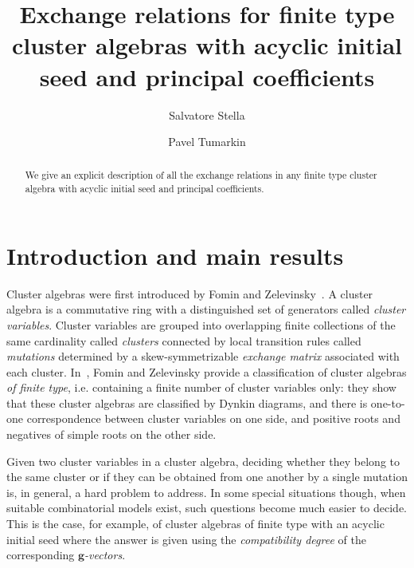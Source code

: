 \documentclass[11pt]{amsart}
\newcommand{\bg}{\mathbf{g}}
\theoremstyle{definition}
\numberwithin{equation}{section}
\numberwithin{figure}{section}
\begin{document}
\title[Exchange relations for finite type]{Exchange relations for finite type cluster algebras with acyclic initial seed and principal coefficients}

\author[Stella]{Salvatore Stella}
\address[Salvatore Stella]{IN$d$AM - Marie Curie Actions fellow, Universit\`a ``La Sapienza'', Roma, Italy.}

\author[tumarkin]{Pavel Tumarkin}
\address[Pavel Tumarkin]{Department of Mathematical Sciences, Durham University, UK}

\begin{abstract}
We give an explicit description of all the exchange relations in any finite type cluster algebra with acyclic initial seed and principal coefficients.
\end{abstract}

\maketitle

\section{Introduction and main results}
\say[PT]{}
Cluster algebras were first introduced by Fomin and Zelevinsky~\cite{FZ02}. A cluster algebra is a commutative ring with a distinguished set of generators called {\em cluster variables}. Cluster variables are grouped into overlapping finite collections of the same cardinality called {\em clusters} connected by local transition rules called {\em mutations} determined by a skew-symmetrizable {\em exchange matrix} associated with each cluster. In~\cite{FZ03}, Fomin and Zelevinsky provide a classification of cluster algebras {\em of finite type}, i.e. containing a finite number of cluster variables only: they show that these cluster algebras are classified by Dynkin diagrams, and there is one-to-one correspondence between cluster variables on one side, and positive roots and negatives of simple roots on the other side. 

Given two cluster variables in a cluster algebra, deciding whether they belong to the same cluster or if they can be obtained from one another by a single mutation is, in general, a hard problem to address.
  In some special situations though, when suitable combinatorial models exist, such questions become much easier to decide.
  This is the case, for example, of cluster algebras of finite type with an acyclic initial seed where the answer is given using the \emph{compatibility degree} of the corresponding \emph{$\bg$-vectors}.
  
\end{document}
